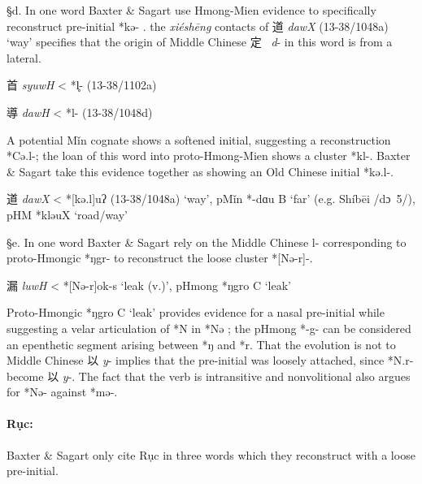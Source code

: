 §d. In one word Baxter \& Sagart use Hmong-Mien evidence to specifically
reconstruct pre-initial *kə- 
\citeyearpar[184]{Baxter2014OldChinese}. the \emph{xiéshēng} contacts
of 道 \emph{dawX} (13-38/1048a) `way' specifies that the origin of
Middle Chinese 定~ \emph{d}- in this word is from a lateral.

\begin{description} \item
首 \emph{syuwH} \textless{} *l̥- (13-38/1102a)
\item
導  \emph{dawH} \textless{} *l- (13-38/1048d)
\end{description}

A potential Mǐn cognate shows a softened initial, suggesting a
reconstruction *Cə.l{}-; the loan of this word into proto-Hmong-Mien
shows a cluster *kl-. Baxter \& Sagart take this evidence together as
showing an Old Chinese initial *kə.l{}-.

\begin{description} \item
道  \emph{dawX} \textless{} *[kə.l]{}uʔ (13-38/1048a) `way', pMǐn
*-dɑu B `far' (e.g. Shíbēi /dɔ~5/), pHM *kləuX `road/way'
\end{description}

§e. In one word Baxter \& Sagart rely on the Middle Chinese l-
corresponding to proto-Hmongic *ŋgr- to reconstruct the loose cluster
*[Nə-r]{}-.

\begin{description} \item
漏  \emph{luwH} \textless{} *[Nə-r]{}ok-s `leak (v.)', pHmong *ŋgro C
`leak'
\end{description}

Proto-Hmongic *ŋgro C `leak' provides evidence for a nasal pre-initial
while suggesting a velar articulation of *N in *Nə ; the pHmong *-g- can
be considered an epenthetic segment arising between *ŋ and *r. That the
evolution is not to Middle Chinese 以  \emph{y}- implies that the
pre-initial was loosely attached, since *N.r{}- become 以  \emph{y}-. The
fact that the verb is intransitive and nonvolitional also argues for
*Nə- against *mə-.

\paragraph{Rục:} Baxter \& Sagart only cite
Rục in three words which they reconstruct with a loose pre-initial.

